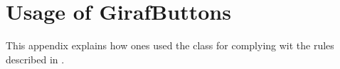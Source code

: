 \chapter{Usage of GirafButtons}
\label{app:usage_of_girafbuttons}

This appendix explains how ones used the class  for complying wit the rules described in .



